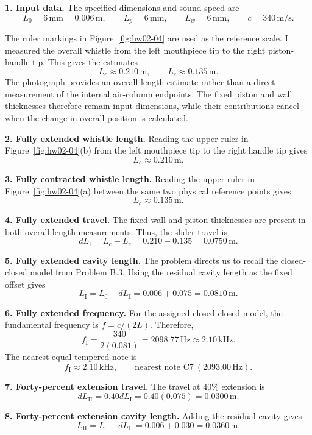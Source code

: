 \textbf{1. Input data.} The specified dimensions and sound speed are
\[
\boxed{L_{0}=6\,\mathrm{mm}=0.006\,\mathrm{m},\qquad
L_{p}=6\,\mathrm{mm},\qquad L_{w}=6\,\mathrm{mm},\qquad
c=340\,\mathrm{m/s}.}
\]

The ruler markings in Figure~\ref{fig:hw02-04} are used as the reference scale. I measured the overall whistle from the left mouthpiece tip to the right piston-handle tip. This gives the estimates
\[
\boxed{L_{e}\approx 0.210\,\mathrm{m},\qquad L_{c}\approx 0.135\,\mathrm{m}.}
\]
The photograph provides an overall length estimate rather than a direct measurement of the internal air-column endpoints. The fixed piston and wall thicknesses therefore remain input dimensions, while their contributions cancel when the change in overall position is calculated.

\textbf{2. Fully extended whistle length.} Reading the upper ruler in Figure~\ref{fig:hw02-04}(b) from the left mouthpiece tip to the right handle tip gives
\[
\boxed{L_{e}\approx 0.210\,\mathrm{m}.}
\]

\textbf{3. Fully contracted whistle length.} Reading the upper ruler in Figure~\ref{fig:hw02-04}(a) between the same two physical reference points gives
\[
\boxed{L_{c}\approx 0.135\,\mathrm{m}.}
\]

\textbf{4. Fully extended travel.} The fixed wall and piston thicknesses are present in both overall-length measurements. Thus, the slider travel is
\[
\boxed{dL_{\mathrm{I}}=L_{e}-L_{c}=0.210-0.135=0.0750\,\mathrm{m}.}
\]

\textbf{5. Fully extended cavity length.} The problem directs us to recall the closed-closed model from Problem B.3. Using the residual cavity length as the fixed offset gives
\[
\boxed{L_{\mathrm{I}}=L_{0}+dL_{\mathrm{I}}=0.006+0.075=0.0810\,\mathrm{m}.}
\]

\textbf{6. Fully extended frequency.} For the assigned closed-closed model, the fundamental frequency is $f=c/(2L)$. Therefore,
\[
f_{\mathrm{I}}=\frac{340}{2(0.081)}=2098.77\,\mathrm{Hz}\approx 2.10\,\mathrm{kHz}.
\]
The nearest equal-tempered note is
\[
\boxed{f_{\mathrm{I}}\approx2.10\,\mathrm{kHz},\qquad \text{nearest note }\mathrm{C7}\ (2093.00\,\mathrm{Hz}).}
\]

\textbf{7. Forty-percent extension travel.} The travel at $40\%$ extension is
\[
\boxed{dL_{\mathrm{II}}=0.40dL_{\mathrm{I}}=0.40(0.075)=0.0300\,\mathrm{m}.}
\]

\textbf{8. Forty-percent extension cavity length.} Adding the residual cavity gives
\[
\boxed{L_{\mathrm{II}}=L_{0}+dL_{\mathrm{II}}=0.006+0.030=0.0360\,\mathrm{m}.}
\]

